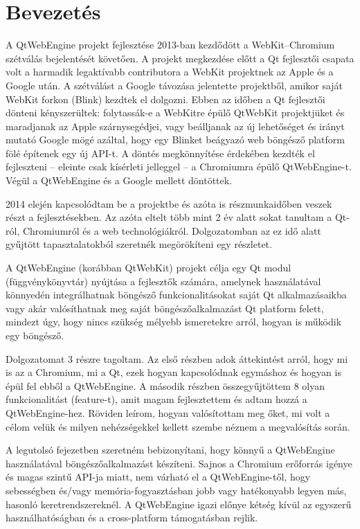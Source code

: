 \documentclass[12pt]{report}
\begin{document}

\chapter*{Bevezetés}
A QtWebEngine projekt fejlesztése 2013-ban kezdődött a WebKit--Chromium szétválás bejelentését
követően. A projekt megkezdése előtt a Qt fejlesztői csapata volt a harmadik legaktívabb
contributora a WebKit projektnek az Apple és a Google után. A szétválást a Google távozása
jelentette projektből, amikor saját WebKit forkon (Blink) kezdtek el dolgozni. Ebben az időben
a Qt fejlesztői dönteni kényszerültek: folytassák-e a WebKitre épülő QtWebKit
projektjüket és maradjanak az Apple szárnysegédjei, vagy beálljanak az új lehetőséget
és irányt mutató Google mögé azáltal, hogy egy Blinket beágyazó web  böngésző platform fölé
építenek egy új API-t. A döntés megkönnyítése érdekében kezdték el fejleszteni -- eleinte csak
kísérleti jelleggel -- a Chromiumra épülő QtWebEngine-t. Végül a QtWebEngine és a Google
mellett döntöttek.
\cite{bib:qt-blog-introducing-qtwebengine}

2014 elején kapcsolódtam be a projektbe és azóta is részmunkaidőben veszek részt a
fejlesztésekben. Az azóta eltelt több mint 2 év alatt sokat tanultam a Qt-ról,
Chromiumról és a web technológiákról. Dolgozatomban az ez idő alatt gyűjtött
tapasztalatokból szeretnék megörökíteni egy részletet.

A QtWebEngine (korábban QtWebKit) projekt célja egy Qt modul (függvénykönyvtár) nyújtása a
fejlesztők számára, amelynek használatával könnyedén integrálhatnak böngésző
funkcionalitásokat saját Qt alkalmazásaikba vagy akár valósíthatnak meg saját
böngészőalkalmazást Qt platform felett, mindezt úgy, hogy nincs szükség mélyebb ismeretekre
arról, hogyan is működik egy böngésző.

Dolgozatomat 3 részre tagoltam. Az első részben adok áttekintést arról, hogy mi is az a
Chromium, mi a Qt, ezek hogyan kapcsolódnak egymáshoz és hogyan is épül fel ebből a
QtWebEngine.
A második részben összegyűjtöttem 8 olyan funkcionalitást (feature-t), amit magam
fejlesztettem és adtam hozzá a QtWebEngine-hez. Röviden leírom, hogyan valósítottam meg
őket, mi volt a célom velük és milyen nehézségekkel kellett szembe néznem a megvalósítás
során.

A legutolsó fejezetben szeretném bebizonyítani, hogy könnyű a QtWebEngine használatával
böngészőalkalmazást készíteni. Sajnos a Chromium erőforrás igénye és magas szintű API-ja
miatt, nem várható el a QtWebEngine-től, hogy sebességben és/vagy memória-fogyasztásban
jobb vagy hatékonyabb legyen más, hasonló keretrendszereknél.
A QtWebEngine igazi előnye kétség kívül az egyszerű használhatóságban és a cross-platform
támogatásban rejlik.
\end{document}
